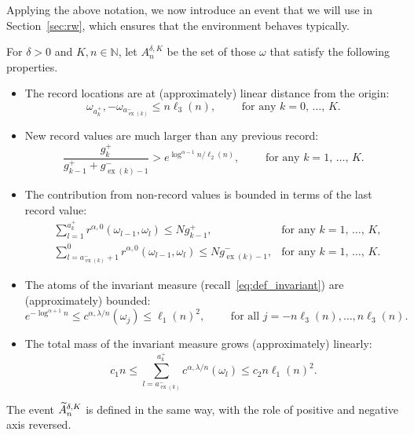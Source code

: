 \documentclass[AHL,Unicode,longabstracts,published]{cedram}
\newcommand{\N}{\mathbb N}
\newcommand\ex{\operatorname{ex}}
\newcommand{\aat}[1]{a_{\ex(#1)}^-}
\newcommand{\gtt}[1]{g_{\ex(#1)-1}^-}
\let\oldtilde\tilde
\renewcommand*{\tilde}[1]{\mathchoice{\widetilde{#1}}{\widetilde{#1}}{\oldtilde{#1}}{\oldtilde{#1}}}
\begin{document}
Applying the above notation, we now introduce an event that we will use in Section~\ref{sec:rw}, which ensures that the environment behaves typically.

\begin{defi}\label{def:A}
For $\delta>0$ and $K,n\in\N$, let $A^{\delta,K}_n$ be the set of those $\omega$ that satisfy the following properties.
\begin{itemize}
\item The record locations are at (approximately) linear distance from the origin:
\begin{equation}\label{eq:space_scaling}
\omega_{a_k^+},-\omega_{\aat{k}}\leq n\ell_3(n),\qquad\text{ for any }k=0,\,\dots,\,K.
\end{equation}
\item New record values are much larger than any previous record:
\begin{equation}\label{eq:separation}
\frac{g_{k}^+}{g_{k-1}^+ + \gtt{k}}> e^{\log^{\alpha-1} n/\ell_2(n)},\qquad\text{ for any }k=1,\,\dots,\,K.
\end{equation}
\item The contribution from non-record values is bounded in terms of the last record value:
\begin{align}
&{\textstyle \sum_{l=1}^{a_k^+} }r^{\alpha,0}(\omega_{l-1},\omega_{l})\le Ng_{k-1}^+,&\text{for any }k=1,\,\dots,\,K,\label{eq:NN+}
\\
&{\textstyle \sum_{l=\aat{k}+1}^0} r^{\alpha,0}(\omega_{l-1},\omega_l)\le N \gtt{k},&\text{for any }k=1,\,\dots,\,K.\label{eq:NN-}
\end{align}
\item The atoms of the invariant measure (recall~\eqref{eq:def_invariant}) are (approximately) boun\-ded:
\begin{equation}\label{eq:pointwise}
e^{-\log^{\alpha+1}n}\leq c^{\alpha,\lambda/n}(\omega_j)\leq \ell_1(n)^2,\qquad\text{ for all }j=-n\ell_3(n),\dots,n\ell_3(n).
\end{equation}
\item The total mass of the invariant measure grows (approximately) linearly:
\begin{equation}\label{eq:mass_control}
c_1n \le {\textstyle \sum_{l=\aat{k}}^{a_k^+}} c^{\alpha,\lambda/n}(\omega_l) \le c_2n \ell_1(n)^2.
\end{equation}
\end{itemize}
The event $\tilde A_n^{\delta,K}$ is defined in the same way, with the role of positive and negative axis reversed.
\end{defi}
\end{document}
